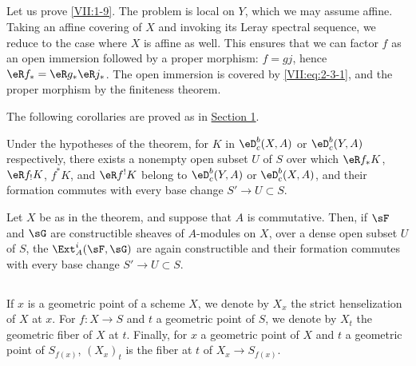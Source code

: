 \subsection{}\label{VII:2-8}

Let us prove \ref{VII:1-9}. The problem is local on $Y$, which we may assume
affine. Taking an affine covering of $X$ and invoking its Leray spectral
sequence, we reduce to the case where $X$ is affine as well. This ensures that
we can factor $f$ as an open immersion followed by a proper morphism:
$f=g j$, hence $\eR f_\ast = \eR g_\ast \eR j_\ast$. The open immersion is
covered by \eqref{VII:eq:2-3-1}, and the proper morphism by the finiteness
theorem.

The following corollaries are proved as in \hyperref[VII:1]{Section 1}.





\begin{corollary_}\label{VII:2-9}
Under the hypotheses of the theorem, for $K$ in $\eD_c^b(X,A)$ or
$\eD_c^b(Y,A)$ respectively, there exists a nonempty open subset $U$ of $S$
over which $\eR f_\ast K$, $\eR f_! K$, $f^\ast K$, and $\eR f^! K$ belong to
$\eD_c^b(Y,A)$ or $\eD_c^b(X,A)$, and their formation commutes with every base
change $S' \to U\subset S$.
\end{corollary_}





\begin{corollary_}\label{VII:2-10}
Let $X$ be as in the theorem, and suppose that $A$ is commutative. Then, if
$\sF$ and $\sG$ are constructible sheaves of $A$-modules on $X$, over a dense
open subset $U$ of $S$, the $\Ext_A^i(\sF,\sG)$ are again constructible and
their formation commutes with every base change $S' \to U\subset S$.
\end{corollary_}





\subsection{}\label{VII:2-11}

If $x$ is a geometric point of a scheme $X$, we denote by $X_x$ the strict
henselization of $X$ at $x$. For $f:X\to S$ and $t$ a geometric point of $S$,
we denote by $X_t$ the geometric fiber of $X$ at $t$. Finally, for $x$ a
geometric point of $X$ and $t$ a geometric point of $S_{f(x)}$, $(X_x)_t$ is
the fiber at $t$ of $X_x \to S_{f(x)}$.





